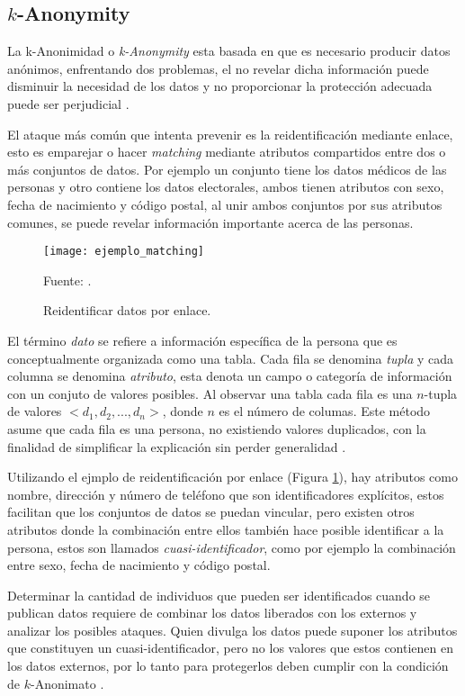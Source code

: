 \subsection{$k$-Anonymity}

La k-Anonimidad o \textit{k-Anonymity} esta basada en que es necesario producir datos anónimos, enfrentando dos problemas, el no revelar dicha información puede disminuir la necesidad de los datos y no proporcionar la protección adecuada puede ser perjudicial \cite{sweeney2002k}.

El ataque más común que intenta prevenir es la reidentificación mediante enlace, esto es emparejar o hacer \textit{matching} mediante atributos compartidos entre dos o más conjuntos de datos. Por ejemplo un conjunto tiene los datos médicos de las personas y otro contiene los datos electorales, ambos tienen atributos con sexo, fecha de nacimiento y código postal, al unir ambos conjuntos por sus atributos comunes, se puede revelar información importante acerca de las personas.

\begin{figure}[h]
\centering
\texttt{[image: ejemplo\_matching]}
\caption{\label{fig:linking_data} Reidentificar datos por enlace.} Fuente: \cite{sweeney2002k}.
\end{figure}

El término \textit{dato} se refiere a información específica de la persona que es conceptualmente organizada  como una tabla. Cada fila se denomina \textit{tupla} y cada columna se denomina \textit{atributo}, esta denota un campo o categoría de información con un conjuto de valores posibles. Al observar una tabla cada fila es una $n$-tupla de valores $<d_{1}, d_{2}, ..., d_{n}>$, donde $n$ es el número de columas. Este método asume que cada fila es una persona, no existiendo valores duplicados, con la finalidad de simplificar la explicación sin perder generalidad \cite{sweeney2002k}.

Utilizando el ejmplo de reidentificación por enlace (Figura \ref{fig:linking_data}), hay atributos como nombre, dirección y número de teléfono que son identificadores explícitos, estos facilitan que los conjuntos de datos se puedan vincular, pero existen otros atributos donde la combinación entre ellos también hace posible identificar a la persona, estos son llamados \textit{cuasi-identificador}, como por ejemplo la combinación entre sexo, fecha de nacimiento y código postal.

Determinar la cantidad de individuos que pueden ser identificados cuando se publican datos requiere de combinar los datos liberados con los externos y analizar los posibles ataques. Quien divulga los datos puede suponer los atributos que constituyen un  cuasi-identificador, pero no los valores que estos contienen en los datos externos, por lo tanto para protegerlos deben cumplir con la condición de $k$-Anonimato \cite{sweeney2002k}.

